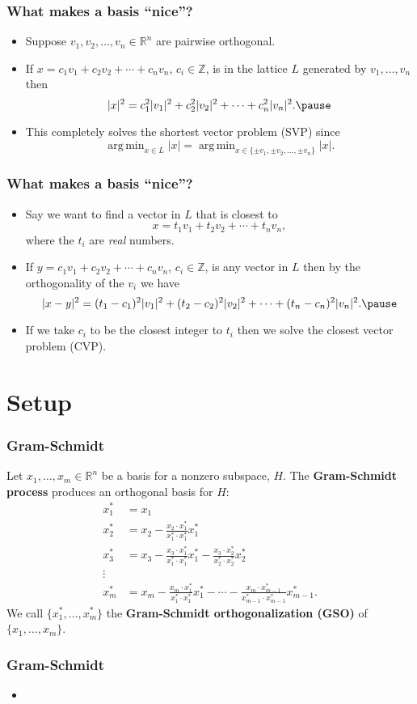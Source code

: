 \documentclass{beamer}
\newcommand{\integers}{\mathbb{Z}}
\newcommand{\reals}{\mathbb{R}}
\DeclareMathOperator*{\argmin}{arg\,min}
\begin{document}
\begin{frame}
	\frametitle{What makes a basis ``nice''?}
	\begin{itemize}
		\item Suppose $v_1, v_2, \ldots, v_n\in \reals^n$ are pairwise orthogonal.\pause
		\item If $x = c_1v_1+c_2v_2 + \cdots + c_nv_n$, $c_i\in \integers$, is in the lattice $L$ generated by $v_1, \ldots, v_n$ then
		\[
		|x|^2 = c_1^2|v_1|^2 + c_2^2|v_2|^2 + \cdots + c_n^2|v_n|^2.\pause
		\]
		\item This completely solves the shortest vector problem (SVP) since
		\[
		\argmin_{x\in L}|x| = \argmin_{x\in \{\pm v_1, \pm v_2, \ldots, \pm v_n\}}|x|.
		\]
	\end{itemize}
\end{frame}

\begin{frame}
	\frametitle{What makes a basis ``nice''?}
	\begin{itemize}
		\item Say we want to find a vector in $L$ that is closest to
		\[
		x = t_1v_1 + t_2v_2 + \cdots + t_nv_n,
		\]
		where the $t_i$ are \textit{real} numbers.\pause
		\item If $y = c_1v_1+c_2v_2 + \cdots + c_nv_n$, $c_i\in \integers$, is any vector in $L$ then by the orthogonality of the $v_i$ we have
		\[
		|x-y|^2 = (t_1-c_1)^2|v_1|^2 + (t_2-c_2)^2|v_2|^2 + \cdots + (t_n-c_n)^2|v_n|^2.\pause
		\]
		\item If we take $c_i$ to be the closest integer to $t_i$ then we solve the closest vector problem (CVP).
	\end{itemize}
\end{frame}

\section{Setup}
\begin{frame}
	\frametitle{Gram-Schmidt}
		\begin{definition}
			Let $x_1, \ldots, x_m \in \reals^n$ be a basis for a nonzero subspace, $H$. The \textbf{Gram-Schmidt process} produces an orthogonal basis for $H$:
			\begin{align*}
				x_1^* &= x_1\\
				x_2^* &= x_2 - \frac{x_2\cdot x_1^*}{x_1^*\cdot x_1^*}x_1^*\\
				x_3^* &= x_3 - \frac{x_3\cdot x_1^*}{x_1^*\cdot x_1^*}x_1^* - \frac{x_3\cdot x_2^*}{x_2^*\cdot x_2^*}x_2^*\\
				\vdots\\
				x_m^* &= x_m - \frac{x_m\cdot x_1^*}{x_1^*\cdot x_1^*}x_1^* - \cdots - \frac{x_m\cdot x_{m-1}^*}{x_{m-1}^*\cdot x_{m-1}^*}x_{m-1}^*.
			\end{align*}
			We call $\{x_1^*, \ldots, x_m^*\}$ the \textbf{Gram-Schmidt orthogonalization (GSO)} of $\{x_1, \ldots, x_m\}$.
		\end{definition}
\end{frame}

\begin{frame}
	\frametitle{Gram-Schmidt}
	\begin{itemize}
		\item 
	\end{itemize}
\end{frame}
\end{document}

